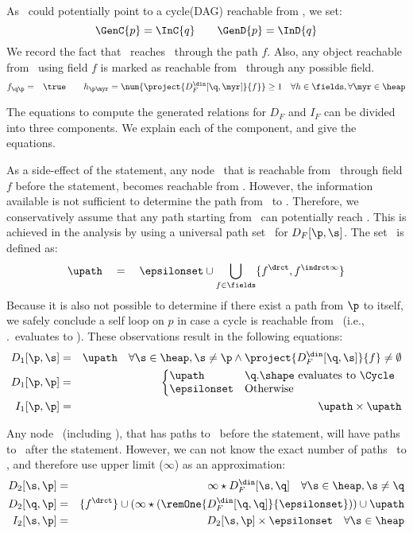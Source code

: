 \begin{enumerate}
  As \p\ could potentially point to a cycle(DAG) reachable
  from \q, we set:
  $$\GenC{p} = \InC{q} \qquad \GenD{p} = \InD{q}$$ We record
  the fact that \q\ reaches \p\ through the path
  $f$. Also, any object reachable from \q\ using field $f$
  is marked as reachable from \p\ through any
  possible field.
\begin{eqnarray*}
  f_{\q\p} &=& \true  \qquad
  {h_{\p\myr}} =
  \num{\project{D_F^{\din}[\q,\myr]}{f}} \geq 1\quad
  \forall h \in \fields, \forall \myr \in \heap 
\end{eqnarray*}

The equations to compute the generated relations for  $D_F$ and $I_F$
can be divided into three components. We explain each of the
component, and give the equations.

As a side-effect of the statement, any node \s\ that is
reachable from \q\ through field $f$ before the statement,
becomes reachable from \p. However, the information available
is not sufficient to determine the path from \p\ to
\s. Therefore, we conservatively assume that any path
starting from \p\ can potentially reach \s. This is achieved
in the analysis by using a universal path set \upath\ for
$D_F[\p,\s]$. The set \upath\ is defined as:
\[ \upath \quad=\quad \epsilonset \cup \bigcup_{f\in\fields} \{f^{\drct},
f^{\indrct\infty}\} \] Because it is also not possible to determine
if there exist a path from $\p$ to itself,  we safely
conclude a self loop on $p$ in case a cycle is reachable
from \q\ (i.e., \q.\shape\ evaluates to \Cycle). 
These
observations result in the following equations:
\begin{eqnarray*}
  D_1[\p, \s] &=&  \upath \quad
  \forall \s \in \heap, \s \not=\p \wedge
  \project{D_F^{\din}[\q, \s]}{f} \not= \emptyset
  \\
  D_1[\p, \p] &=& \left\{\begin{array}{@{}ll}
    \upath& \q.\shape \mbox{ evaluates to } \Cycle \\
    \epsilonset & \mbox{Otherwise}
  \end{array}\right.  \\
  I_1[\p, \p] &=& \upath \times \upath  
\end{eqnarray*}

Any node \s\ (including \q), that has paths to \q\ before the
statement, will have paths to \p\ after the
statement. However, we can not know the exact number of paths
\s\ to \p, and therefore use upper limit ($\infty$) as an
approximation:
\begin{eqnarray*}
  D_2[\s, \p] &=& \infty \star D_F^{\din}[\s, \q] \quad
  \forall \s \in \heap, \s \not=\q \\
  {D_2[\q,\p]} &=& \{ f^{\drct}\} \cup (\infty \star (\remOne{D_F^{\din}[\q, \q]}{\epsilonset})) \cup \upath  \\ 
  I_2[\s, \p] &=& D_2[\s, \p] \times
  \epsilonset \quad \forall \s \in \heap 
\end{eqnarray*}


\end{enumerate}
